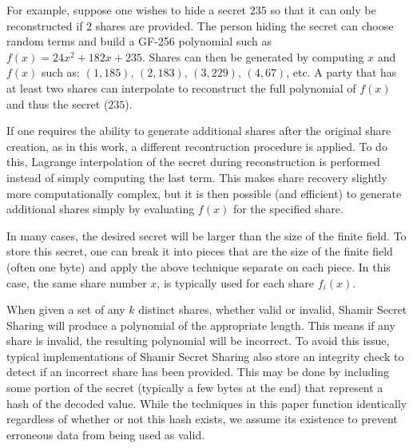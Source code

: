 For example, suppose one wishes to hide a secret $235$ so that it can only be
reconstructed if $2$ shares are provided.   The person hiding the secret can 
choose random terms and build a GF-256 polynomial such as $f(x) = 24x^2 + 
182x + 235$.   Shares can then be generated by computing $x$ and $f(x)$ such
as: $(1,185)$, $(2, 183)$, $(3, 229)$, $(4,67)$, etc.   A party that has at 
least two shares can interpolate to reconstruct the full polynomial of
$f(x)$ and thus the secret ($235$).

If one requires the ability to generate additional shares
after the original share creation, as in this work, a different recontruction
procedure is applied.   To do this, Lagrange interpolation of the secret during 
reconstruction is performed instead of simply computing the last term.   This 
makes share recovery slightly more computationally
complex, but it is then possible (and efficient) to generate additional shares
simply by evaluating $f(x)$ for the specified share.

In many cases, the desired secret will be larger than the size of the finite
field.   To store this secret, one can break it into pieces that are the size
of the finite field (often one byte) and apply the above technique separate on 
each piece.  In this case, the same share number $x$, is typically used for 
each share $f_i(x)$.

When given a set of any $k$ distinct shares, whether valid or invalid, Shamir
Secret Sharing will produce a polynomial of the appropriate length.
This means if any share is invalid, the resulting polynomial will be 
incorrect.   To avoid this issue, 
typical implementations of Shamir Secret Sharing also store an integrity check
to detect if an incorrect share has been provided.   This may be
done by including some portion of the secret (typically a few bytes at the 
end) that represent a hash of the decoded value.  While the techniques
in this paper function identically regardless of whether or not this
hash exists, we assume its existence to prevent erroneous data from
being used as valid.   




